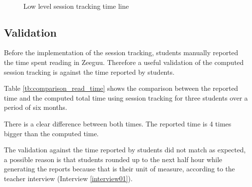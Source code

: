 \begin{figure}[!htb]
	\myfloatalign
	 \quad 
		
	 \\
	\caption{Low level session tracking time line}\label{fig:detailed_session_comparison}
\end{figure}


\subsection{Validation}
Before the implementation of the session tracking, students manually reported the time spent reading in Zeeguu. Therefore a useful validation of the computed session tracking is against the time reported by students.

Table \ref{tb:comparison_read_time} shows the comparison between the reported time and the computed total time using session tracking for three students over a period of six months.

There is a clear difference between both times. The reported time is 4 times bigger than the computed time.

The validation against the time reported by students did not match as expected, a possible reason is that students rounded up to the next half hour while generating the reports because that is their unit of measure, according to the teacher interview (Interview \ref{interview01}). 

